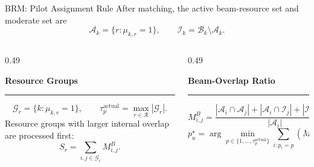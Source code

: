 \documentclass[aspectratio=169, 10pt]{beamer}
\newcommand{\tauactual}{\tau_p^{\mathrm{actual}}}
\newcommand{\slideheading}[1]{%
    \par\vspace{0.08cm}%
    \settowidth{\dimen0}{\bfseries\large #1}%
    {\bfseries\large #1}%
    \par\vspace{0.015cm}%
    {\color{black}\rule{\dimen0}{0.7pt}}%
    \par\vspace{0.16cm}%
}
\begin{document}
\begin{frame}[label=main-pilot-rule]{BRM: Pilot Assignment Rule}
    \small
    After matching, the active beam-resource set and moderate set are
    \[
        \mathcal{A}_k
        =
        \{r:\mu_{k,r}=1\},
        \qquad
        \mathcal{I}_k
        =
        \mathcal{B}_k\setminus\mathcal{A}_k.
    \]

    \begin{columns}[T,onlytextwidth]
        \begin{column}{0.49\textwidth}
            \slideheading{Resource Groups}
            \[
                \mathcal{G}_r
                =
                \{k:\mu_{k,r}=1\},
                \qquad
                \tauactual
                =
                \max_{r\in\mathcal{R}}|\mathcal{G}_r|.
            \]
            Resource groups with larger internal overlap are processed first:
            \[
                S_r
                =
                \sum_{i,j\in\mathcal{G}_r}
                M_{i,j}^{B}.
            \]
        \end{column}
        \begin{column}{0.49\textwidth}
            \slideheading{Beam-Overlap Ratio}
            \[
                M_{i,j}^{B}
                =
                \frac{
                    |\mathcal{A}_i\cap\mathcal{A}_j|
                    +
                    |\mathcal{A}_i\cap\mathcal{I}_j|
                    +
                    |\mathcal{I}_i\cap\mathcal{A}_j|
                }{
                    |\mathcal{A}_i|
                }.
            \]
            \[
                p_u^\star
                =
                \arg\min_{p\in\{1,\ldots,\tauactual\}}
                \sum_{i:p_i=p}
                \left(M_{u,i}^{B}+M_{i,u}^{B}\right).
            \]
        \end{column}
    \end{columns}

    \begin{flushright}
        \hyperlink{app-brm-flow}{}
    \end{flushright}
\end{frame}
\end{document}
